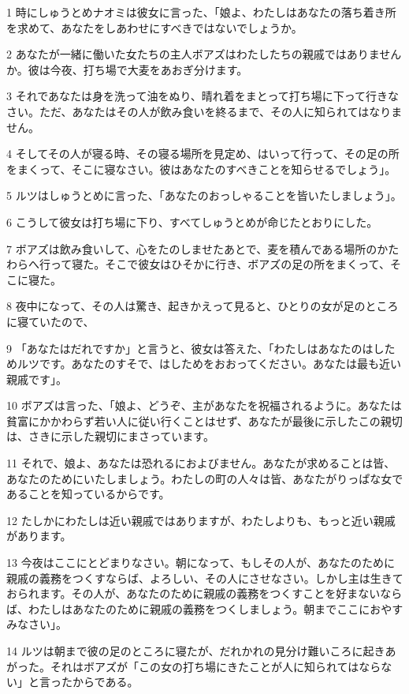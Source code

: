 \par 1 時にしゅうとめナオミは彼女に言った、「娘よ、わたしはあなたの落ち着き所を求めて、あなたをしあわせにすべきではないでしょうか。
\par 2 あなたが一緒に働いた女たちの主人ボアズはわたしたちの親戚ではありませんか。彼は今夜、打ち場で大麦をあおぎ分けます。
\par 3 それであなたは身を洗って油をぬり、晴れ着をまとって打ち場に下って行きなさい。ただ、あなたはその人が飲み食いを終るまで、その人に知られてはなりません。
\par 4 そしてその人が寝る時、その寝る場所を見定め、はいって行って、その足の所をまくって、そこに寝なさい。彼はあなたのすべきことを知らせるでしょう」。
\par 5 ルツはしゅうとめに言った、「あなたのおっしゃることを皆いたしましょう」。
\par 6 こうして彼女は打ち場に下り、すべてしゅうとめが命じたとおりにした。
\par 7 ボアズは飲み食いして、心をたのしませたあとで、麦を積んである場所のかたわらへ行って寝た。そこで彼女はひそかに行き、ボアズの足の所をまくって、そこに寝た。
\par 8 夜中になって、その人は驚き、起きかえって見ると、ひとりの女が足のところに寝ていたので、
\par 9 「あなたはだれですか」と言うと、彼女は答えた、「わたしはあなたのはしためルツです。あなたのすそで、はしためをおおってください。あなたは最も近い親戚です」。
\par 10 ボアズは言った、「娘よ、どうぞ、主があなたを祝福されるように。あなたは貧富にかかわらず若い人に従い行くことはせず、あなたが最後に示したこの親切は、さきに示した親切にまさっています。
\par 11 それで、娘よ、あなたは恐れるにおよびません。あなたが求めることは皆、あなたのためにいたしましょう。わたしの町の人々は皆、あなたがりっぱな女であることを知っているからです。
\par 12 たしかにわたしは近い親戚ではありますが、わたしよりも、もっと近い親戚があります。
\par 13 今夜はここにとどまりなさい。朝になって、もしその人が、あなたのために親戚の義務をつくすならば、よろしい、その人にさせなさい。しかし主は生きておられます。その人が、あなたのために親戚の義務をつくすことを好まないならば、わたしはあなたのために親戚の義務をつくしましょう。朝までここにおやすみなさい」。
\par 14 ルツは朝まで彼の足のところに寝たが、だれかれの見分け難いころに起きあがった。それはボアズが「この女の打ち場にきたことが人に知られてはならない」と言ったからである。
